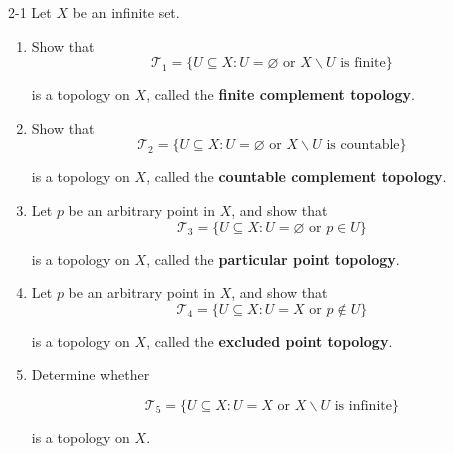 \begin{problem}{2-1}
Let $X$ be an infinite set.
\begin{enumerate}[label={(\alph*)}]
	\item Show that
	      \[
		      \mathscr{T}_{1} = \{ U\subseteq X : U = \varnothing \text{ or } X\smallsetminus U \text{ is finite} \}
	      \]

	      is a topology on $X$, called the \textbf{finite complement topology}.

	\item Show that
	      \[
		      \mathscr{T}_{2} = \{ U\subseteq X : U = \varnothing \text{ or } X\smallsetminus U \text{ is countable} \}
	      \]

	      is a topology on $X$, called the \textbf{countable complement topology}.

	\item Let $p$ be an arbitrary point in $X$, and show that
	      \[
		      \mathscr{T}_{3} = \{ U\subseteq X : U = \varnothing \text{ or } p\in U \}
	      \]

	      is a topology on $X$, called the \textbf{particular point topology}.

	\item Let $p$ be an arbitrary point in $X$, and show that
	      \[
		      \mathscr{T}_{4} = \{ U\subseteq X : U = X \text{ or } p\notin U \}
	      \]

	      is a topology on $X$, called the \textbf{excluded point topology}.

	\item Determine whether

	      \[
		      \mathscr{T}_{5} = \{ U\subseteq X : U = X \text{ or } X\smallsetminus U \text{ is infinite} \}
	      \]

	      is a topology on $X$.
\end{enumerate}
\end{problem}

